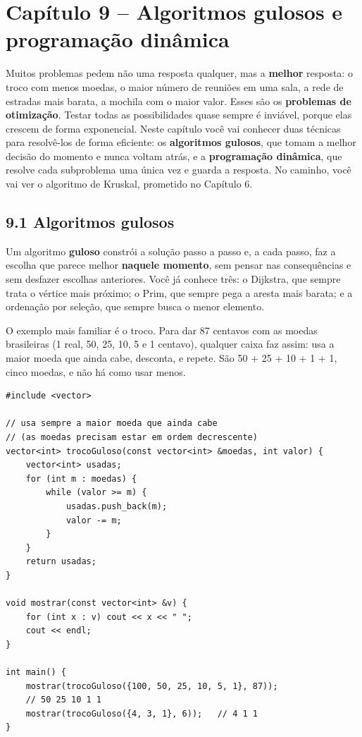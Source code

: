 \section{Capítulo 9 -- Algoritmos gulosos e programação dinâmica}

Muitos problemas pedem não uma resposta qualquer, mas a \textbf{melhor} resposta: o troco com menos moedas, o maior número de reuniões em uma sala, a rede de estradas mais barata, a mochila com o maior valor. Esses são os \textbf{problemas de otimização}. Testar todas as possibilidades quase sempre é inviável, porque elas crescem de forma exponencial. Neste capítulo você vai conhecer duas técnicas para resolvê-los de forma eficiente: os \textbf{algoritmos gulosos}, que tomam a melhor decisão do momento e nunca voltam atrás, e a \textbf{programação dinâmica}, que resolve cada subproblema uma única vez e guarda a resposta. No caminho, você vai ver o algoritmo de Kruskal, prometido no Capítulo 6.

\subsection{9.1 Algoritmos gulosos}

Um algoritmo \textbf{guloso} constrói a solução passo a passo e, a cada passo, faz a escolha que parece melhor \textbf{naquele momento}, sem pensar nas consequências e sem desfazer escolhas anteriores. Você já conhece três: o Dijkstra, que sempre trata o vértice mais próximo; o Prim, que sempre pega a aresta mais barata; e a ordenação por seleção, que sempre busca o menor elemento.

O exemplo mais familiar é o troco. Para dar 87 centavos com as moedas brasileiras (1 real, 50, 25, 10, 5 e 1 centavo), qualquer caixa faz assim: usa a maior moeda que ainda cabe, desconta, e repete. São 50 + 25 + 10 + 1 + 1, cinco moedas, e não há como usar menos.

\begin{codigo}
\begin{Verbatim}[breaklines=true, breaksymbolleft={}, fontsize=\footnotesize]
#include <vector>

// usa sempre a maior moeda que ainda cabe
// (as moedas precisam estar em ordem decrescente)
vector<int> trocoGuloso(const vector<int> &moedas, int valor) {
    vector<int> usadas;
    for (int m : moedas) {
        while (valor >= m) {
            usadas.push_back(m);
            valor -= m;
        }
    }
    return usadas;
}

void mostrar(const vector<int> &v) {
    for (int x : v) cout << x << " ";
    cout << endl;
}

int main() {
    mostrar(trocoGuloso({100, 50, 25, 10, 5, 1}, 87));
    // 50 25 10 1 1
    mostrar(trocoGuloso({4, 3, 1}, 6));   // 4 1 1
}
\end{Verbatim}
\end{codigo}

